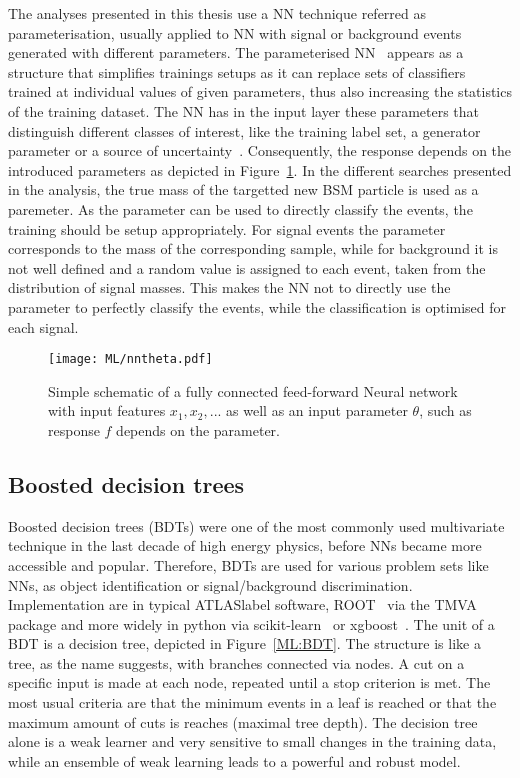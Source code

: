 The analyses presented in this thesis use a NN technique referred as parameterisation, usually applied to NN with signal or background events generated with different parameters. The parameterised NN~\cite{Baldi_2016} appears as a structure that simplifies trainings setups as it can replace sets of classifiers trained at individual values of given parameters, thus also increasing the statistics of the training dataset. The NN has in the input layer these parameters that distinguish different classes of interest, like the training label set, a generator parameter or a source of uncertainty~\cite{Ghosh_2021}. Consequently, the response depends on the introduced parameters as depicted in Figure~\ref{ML:PNN}. In the different searches presented in the analysis, the true mass of the targetted new BSM particle is used as a paremeter. As the parameter can be used to directly classify the events, the training should be setup appropriately. For signal events the parameter corresponds to the mass of the corresponding sample, while for background it is not well defined and a random value is assigned to each event, taken from the distribution of signal masses. This makes the NN not to directly use the parameter to perfectly classify the events, while the classification is optimised for each signal.

\begin{figure}[htbp]
    \RawFloats
    \begin{center}
    \texttt{[image: ML/nntheta.pdf]}
    \caption{
        Simple schematic of a fully connected feed-forward Neural network with input features $x_1, x_2,...$ as well as an input parameter $\theta$, such as response $f$ depends on the parameter.
    }
    \label{ML:PNN}
    \end{center}
\end{figure}

\subsection{Boosted decision trees}

Boosted decision trees (BDTs) were one of the most commonly used multivariate technique in the last decade of high energy physics, before NNs became more accessible and popular. Therefore, BDTs are used for various problem sets like NNs, as object identification or signal/background discrimination. Implementation are in typical \acrshort{ATLASlabel} software, ROOT~\cite{BRUN199781} via the TMVA~\cite{TMVA} package and more widely in python via scikit-learn~\cite{scikit-learn} or xgboost~\cite{Chen_2016}. The unit of a BDT is a decision tree, depicted in Figure~\ref{ML:BDT}. The structure is like a tree, as the name suggests, with branches connected via nodes. A cut on a specific input is made at each node, repeated until a stop criterion is met. The most usual criteria are that the minimum events in a leaf is reached or that the maximum amount of cuts is reaches (maximal tree depth). The decision tree alone is a weak learner and very sensitive to small changes in the training data, while an ensemble of weak learning leads to a powerful and robust model.
 


